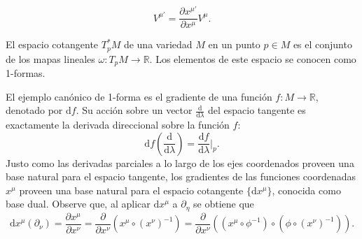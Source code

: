 \begin{equation}
	V^{\mu'}=\frac{\partial x^{\mu'}}{\partial x^{\mu}} V^\mu.
\end{equation}
\begin{defi}
	El espacio cotangente $T^*_pM$ de una variedad $M$ en un punto $p\in M$ es el conjunto de los mapas lineales $\omega:T_pM\rightarrow \mathbb{R}$. Los elementos de este espacio se conocen como 1-formas.
\end{defi}

El ejemplo canónico de 1-forma es el gradiente de una función $f:M\rightarrow \mathbb{R}$, denotado por $\mathrm{d}f$. Su acción sobre un vector $\frac{\mathrm{d}}{\mathrm{d}\lambda}$ del espacio tangente es exactamente la derivada direccional sobre la función $f$:
$$\mathrm{d}f\left( \frac{\mathrm{d}}{\mathrm{d}\lambda} \right)=\frac{\mathrm{d}f}{\mathrm{d}\lambda}\Big|_{p}.$$
Justo como las derivadas parciales a lo largo de los ejes coordenados proveen una base natural para el espacio tangente, los gradientes de las funciones coordenadas $x^\mu$ proveen una base natural para el espacio cotangente $\{\mathrm{d}x^\mu\}$, conocida como base dual. Observe que, al aplicar $\mathrm{d}x^\mu$ a $\partial_\eta$ se obtiene que
$$\mathrm{d}x^\mu(\partial_\nu)=\frac{\partial x^\mu}{\partial x^\nu}=\frac{\partial}{\partial x^\nu}(x^\mu\circ (x^\nu)^{-1})=\frac{\partial}{\partial x^\nu}((x^\mu\circ\phi^{-1})\circ(\phi\circ (x^\nu)^{-1})).$$
\begin{center}
\end{center}

